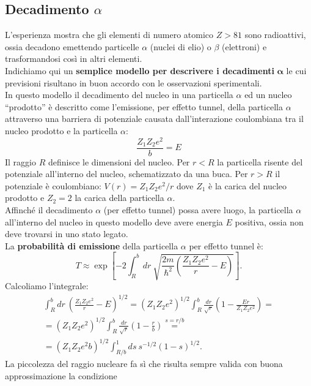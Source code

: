\documentclass[a4paper,11pt,oneside]{book}
\begin{document}
\subsection{Decadimento $\alpha$}
L'esperienza mostra che gli elementi di numero atomico $Z>81$ sono radioattivi, ossia decadono emettendo particelle $\alpha$ (nuclei di elio) o $\beta$ (elettroni) e trasformandosi così in altri elementi.\\
Indichiamo qui un \textbf{semplice modello per descrivere i decadimenti} $\mathbf{\alpha}$ le cui previsioni risultano in buon accordo con le osservazioni sperimentali.\\
In questo modello il decadimento del nucleo in una particella $\alpha$ ed un nucleo ``prodotto'' è descritto come l'emissione, per effetto tunnel, della particella $\alpha$ attraverso una barriera di potenziale causata dall'interazione coulombiana tra il nucleo prodotto e la particella $\alpha$:
\[\frac{Z_1 Z_2 e^2}{b}=E\]
Il raggio $R$ definisce le dimensioni del nucleo. Per $r<R$ la particella risente  del potenziale all'interno del nucleo, schematizzato da una buca. Per $r>R$ il potenziale è coulombiano: $V(r)=Z_1 Z_2 e^2/r$ dove $Z_1$ è la carica del nucleo prodotto e $Z_2=2$ la carica della particella $\alpha$.\\
Affinché il decadimento $\alpha$ (per effetto tunnel) possa avere luogo, la particella $\alpha$ all'interno del nucleo in questo modello deve avere energia $E$ positiva, ossia non deve trovarsi in uno stato legato.\\
La \textbf{probabilità di emissione} della particella $\alpha$ per effetto tunnel è:
\begin{equation}
T \approx \exp \left[ -2 \int _R ^b dr\ \sqrt{\frac{2m}{\hbar ^2}\left(\frac{Z_1 Z_2 e^2}{r}-E\right)}\right].
\end{equation}
Calcoliamo l'integrale:
\begin{eqnarray}
&\displaystyle{\int _R ^b dr\ \left(\frac{Z_1 Z_2 e^2}{r}-E\right)^{1/2}=\left(Z_1 Z_2 e^2\right)^{1/2}\int _R ^b \frac{dr}{\sqrt{r}}\left(1-\frac{Er}{Z_1 Z_2 e^2}\right)=}& \nonumber \\
&\displaystyle{=\left(Z_1 Z_2 e^2\right)^{1/2}\int _R ^b \frac{dr}{\sqrt{r}}\left(1-\frac{r}{b}\right)\overset{s=r/b}{=}}&\nonumber \\
&=\displaystyle{\left(Z_1 Z_2 e^2 b\right)^{1/2}\int _{R/b} ^1 ds\ s^{-1/2} (1-s)^{1/2}}.&
\end{eqnarray}
La piccolezza del raggio nucleare fa sì che risulta sempre valida con buona approssimazione la condizione
\end{document}
